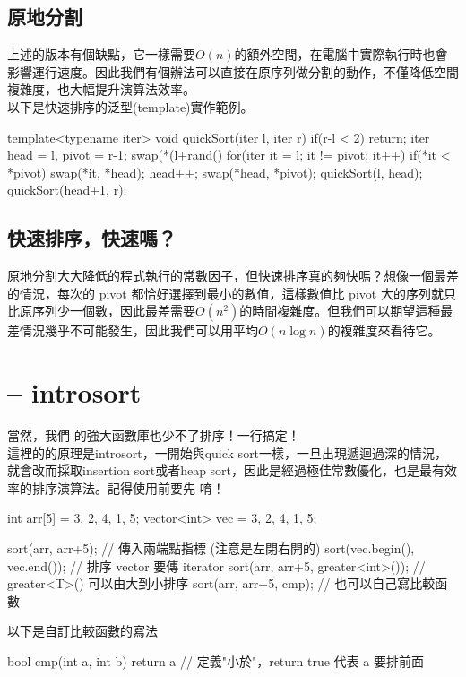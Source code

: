 \subsection{原地分割}
上述的版本有個缺點，它一樣需要$O(n)$的額外空間，在電腦中實際執行時也會影響運行速度。因此我們有個辦法可以直接在原序列做分割的動作，不僅降低空間複雜度，也大幅提升演算法效率。\\
以下是快速排序的泛型(template)實作範例。
\begin{C++}
template<typename iter>
void quickSort(iter l, iter r){
    if(r-l < 2) return;
    iter head = l, pivot = r-1;
    swap(*(l+rand()%
    for(iter it = l; it != pivot; it++){
        if(*it < *pivot){
            swap(*it, *head);
            head++;
        }
    }
    swap(*head, *pivot);
    quickSort(l, head);
    quickSort(head+1, r);
}
\end{C++}
\subsection{快速排序，快速嗎？}
原地分割大大降低的程式執行的常數因子，但快速排序真的夠快嗎？想像一個最差的情況，每次的 pivot 都恰好選擇到最小的數值，這樣數值比 pivot 大的序列就只比原序列少一個數，因此最差需要$O(n^2)$的時間複雜度。但我們可以期望這種最差情況幾乎不可能發生，因此我們可以用平均$O(n\log n)$的複雜度來看待它。
\section{ -- introsort}
當然，我們  的強大函數庫也少不了排序！一行搞定！\\
這裡的的原理是introsort，一開始與quick sort一樣，一旦出現遞迴過深的情況，就會改而採取insertion sort或者heap sort，因此是經過極佳常數優化，也是最有效率的排序演算法。記得使用前要先  唷！
\begin{C++}
int arr[5] = {3, 2, 4, 1, 5};
vector<int> vec = {3, 2, 4, 1, 5};

sort(arr, arr+5);
// 傳入兩端點指標 (注意是左閉右開的)
sort(vec.begin(), vec.end());
// 排序 vector 要傳 iterator
sort(arr, arr+5, greater<int>());
// greater<T>() 可以由大到小排序
sort(arr, arr+5, cmp);
// 也可以自己寫比較函數
\end{C++}
\indent\indent 以下是自訂比較函數的寫法
\begin{C++}
bool cmp(int a, int b){
    return a%
}
// 定義"小於"，return true 代表 a 要排前面
\end{C++}

